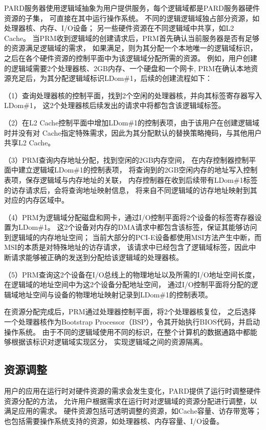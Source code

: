 PARD服务器使用逻辑域抽象为用户提供服务，每个逻辑域都是PARD服务器硬件资源的子集，
可直接在其中运行操作系统。
不同的逻辑逻辑域独占部分资源，如处理器核、内存、I/O设备；
另一些硬件资源在不同逻辑域中共享，如L2 Cache。
当PRM收到逻辑域的创建请求后，PRM首先确认当前服务器是否有足够的资源满足逻辑域的需求，
如果满足，则为其分配一个本地唯一的逻辑域标识，
之后在各个硬件资源的控制平面中为该逻辑域分配所需的资源。
例如，用户创建的逻辑域需要2个处理器核、2GB内存、一个硬盘和一个网卡,
PRM在确认本地资源充足后，为其分配逻辑域标识LDom\#1，后续的创建流程如下：

（1）查询处理器核的控制平面，找到2个空闲的处理器核，并向其标签寄存器写入LDom\#1，
这2个处理器核后续发出的请求中将都包含该逻辑域标签。

（2）在L2 Cache控制平面中增加LDom\#1的控制表项，由于该用户在创建逻辑域时并没有对
Cache指定特殊需求，因此为其分配默认的替换策略掩码，与其他用户共享L2 Cache。

（3）PRM查询内存地址分配，找到空闲的2GB内存空间，
在内存控制器控制平面中建立逻辑域LDom\#1的控制表项，
将查询到的2GB空闲内存的地址写入控制表项，保存逻辑域与内存地址的关联，
内存控制器在收到后续带有LDom\#1标签的访存请求后，会将查询地址映射信息，
将来自不同逻辑域的访存地址映射到其对应的内存区域中。

（4）PRM为逻辑域分配磁盘和网卡，通过I/O控制平面将2个设备的标签寄存器设置为LDom\#1。
这2个设备对内存的DMA请求中都包含该标签，保证其能够访问到逻辑域的内存地址空间；
当前大部分的PCI-E设备都使用MSI方法产生中断，而MSI的本质是对特殊地址的访存请求，
该请求中已经包含了逻辑域标签，因此中断请求能够被正确的发送到分配给该逻辑域的处理器核。

（5）PRM查询这2个设备在I/O总线上的物理地址以及所需的I/O地址空间长度，
在逻辑域的地址空间中为这2个设备分配地址空间，
通过I/O控制平面将分配的逻辑域地址空间与设备的物理地址映射记录到LDom\#1的控制表项。

在资源分配完成后，PRM通过处理器控制平面，将2个处理器核复位，
之后选择一个处理器核作为Bootstrap Processor（BSP），令其开始执行BIOS代码，并启动操作系统。
由于不同的逻辑域使用不同的标识，在整个计算机的数据通路中都能够根据该标识对逻辑域实现区分，
实现逻辑域之间的资源隔离。


\subsection{资源调整}

用户的应用在运行时对硬件资源的需求会发生变化，PARD提供了运行时调整硬件资源分配的方法，
允许用户根据需求在运行时对逻辑域的资源分配进行调整，以满足应用的需求。
硬件资源包括可透明调整的资源，如Cache容量、访存带宽等；
也包括需要操作系统支持的资源，如处理器核、内存容量、I/O设备。

